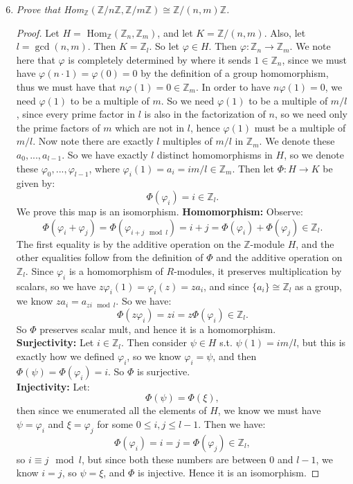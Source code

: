 \documentclass[12pt]{amsbook}
\theoremstyle{plain}
\numberwithin{section}{chapter}
\numberwithin{equation}{chapter}
\theoremstyle{definition}
\theoremstyle{remark}
\newcommand{\z}{\mathbb{Z}}
\renewcommand{\leq}{\leqslant}
\renewcommand{\phi}{\varphi}
\begin{document}
\begin{enumerate}[label=\arabic*.]
\setcounter{enumi}{5}
\item \textit{Prove that Hom$_\z(\z/n\z,\z/m\z) \cong \z/(n,m)\z$. }

\begin{proof}
Let $H = $ Hom$_\z(\z_n,\z_m)$, and let $K = \z/(n,m)$. Also, let $l = \gcd(n,m)$. Then $K = \z_l$. So let $\phi \in H$. Then $\phi:\z_n \to \z_m$. We note here that $\phi$ is completely determined by where it sends $1 \in \z_n$, since we must have $\phi(n\cdot 1) = \phi(0) = 0$ by the definition of a group homomorphism, thus we must have that $n\phi(1) = 0 \in \z_m$. In order to have $n\phi(1) = 0$, we need $\phi(1)$ to be a multiple of $m$. So we need $\phi(1)$ to be a multiple of $m/l$, since every prime factor in $l$ is also in the factorization of $n$, so we need only the prime factors of $m$ which are not in $l$, hence $\phi(1)$ must be a multiple of $m/l$. Now note there are exactly $l$ multiples of $m/l$ in $\z_m$. We denote these $a_0,...,a_{l - 1}$. So we have exactly $l$ distinct homomorphisms in $H$, so we denote these $\phi_0,...,\phi_{l - 1}$, where $\phi_i(1) = a_i = im/l \in \z_m$. Then let $\Phi: H \to K$ be given by:
$$
\Phi(\phi_i) = i \in \z_l.
$$
We prove this map is an isomorphism. 
\textbf{Homomorphism: } Observe: 
$$
\Phi(\phi_i + \phi_j) = \Phi(\phi_{i + j \mod l}) = i + j = \Phi(\phi_i) + \Phi(\phi_j) \in \z_l.
$$
The first equality is by the additive operation on the $\z$-module $H$, and the other equalities follow from the definition of $\Phi$ and the additive operation on $\z_l$. Since $\phi_i$ is a homomorphism of $R$-modules, it preserves multiplication by scalars, so we have $z\phi_i(1) = \phi_i(z) = za_i$, and since $\{a_i\} \cong \z_l$ as a group, we know $za_i = a_{zi \mod l}$. So we have:
$$
\Phi(z\phi_i) = zi = z\Phi(\phi_i) \in \z_l.
$$
So $\Phi$ preserves scalar mult, and hence it is a homomorphism. \\
\textbf{Surjectivity: } Let $i \in \z_l$. Then consider $\psi \in H$ s.t. $\psi(1) = im/l$, but this is exactly how we defined $\phi_i$, so we know $\phi_i = \psi$, and then $\Phi(\psi) = \Phi(\phi_i) = i$. So $\Phi$ is surjective. \\
\textbf{Injectivity: }Let: 
$$
\Phi(\psi) = \Phi(\xi),
$$
then since we enumerated all the elements of $H$, we know we must have $\psi = \phi_i$ and $\xi = \phi_j$ for some $0 \leq i,j \leq l - 1$. Then we have: 
$$
\Phi(\phi_i) = i = j = \Phi(\phi_j) \in \z_l,
$$
so $i \equiv j \mod l$, but since both these numbers are between $0$ and $l - 1$, we know $i  =j$, so $\psi = \xi$, and $\Phi$ is injective. Hence it is an isomorphism. 
\end{proof}


\end{enumerate}
\end{document}
